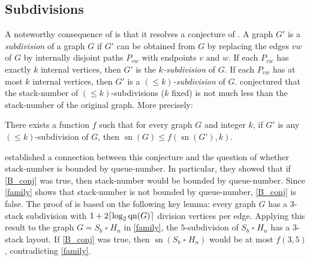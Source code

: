 \documentclass[kpfonts]{patmorin}
\DeclareMathOperator{\sn}{sn}
\DeclareMathOperator{\qn}{qn}
\renewcommand{\leq}{\leqslant}
\newcommand{\CartProd}{\mathbin{\square}}
\begin{document}

\subsection*{Subdivisions}

A noteworthy consequence of  is that it resolves a conjecture of \citet{BO99}. A graph $G'$ is a \textit{subdivision} of a graph $G$ if $G'$ can be obtained from $G$ by replacing the edges $vw$ of $G$ by internally disjoint paths $P_{vw}$ with endpoints $v$ and $w$. If each $P_{vw}$ has exactly $k$ internal vertices, then $G'$ is the \emph{$k$-subdivision} of $G$. If each $P_{vw}$ has at most $k$ internal vertices, then $G'$ is a \emph{$(\leq k)$-subdivision} of $G$. \citet{BO99} conjectured that the stack-number of $(\leq k)$-subdivisions ($k$ fixed)  is not much less than the stack-number of the original graph. More precisely:

\begin{conj}[\citep{BO99}]
\label{B_conj}
There exists a function $f$ such that for every graph $G$ and integer $k$, if $G'$ is any $(\leq k)$-subdivision of $G$, then $\sn(G) \leq f(\sn(G’),k)$.
\end{conj}

\citet{DujWoo05} established a connection between this conjecture and the question of whether stack-number is bounded by queue-number. In particular, they showed that if
\cref{B_conj} was true, then stack-number would be bounded by queue-number. Since \cref{family} shows that stack-number is not bounded by queue-number, \cref{B_conj} is false. The proof of \citet{DujWoo05} is based on the following key lemma: every graph $G$ has a $3$-stack subdivision with $1+2 \ceil{\log_2\qn(G)}$ division vertices per edge. Applying this result to the graph $G=S_b\CartProd H_n$ in \cref{family},
the $5$-subdivision of $S_b\CartProd H_n$ has a $3$-stack layout. If \cref{B_conj} was true, then  $\sn(S_b\CartProd H_n)$ would be at most $f( 3,5)$, contradicting \cref{family}.


\end{document}
